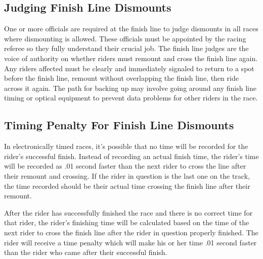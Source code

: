 \subsection{Judging Finish Line Dismounts}
One or more officials are required at the finish line to judge dismounts in all races where dismounting is allowed.
These officials must be appointed by the racing referee so they fully understand their crucial job.
The finish line judges are the voice of authority on whether riders must remount and cross the finish line again.
Any riders affected must be clearly and immediately signaled to return to a spot before the finish line, remount without overlapping the finish line, then ride across it again.
The path for backing up may involve going around any finish line timing or optical equipment to prevent data problems for other riders in the race.

\subsection{Timing Penalty For Finish Line Dismounts}
In electronically timed races, it's possible that no time will be recorded for the rider's successful finish.
Instead of recording an actual finish time, the rider's time will be recorded as .01 second faster than the next rider to cross the line after their remount and crossing.
If the rider in question is the last one on the track, the time recorded should be their actual time crossing the finish line after their remount.

After the rider has successfully finished the race and there is no correct time for that rider, the rider’s finishing time will be calculated based on the time of the next rider to cross the finish line after the rider in question properly finished.
The rider will receive a time penalty which will make his or her time .01 second faster than the rider who came after their successful finish.

